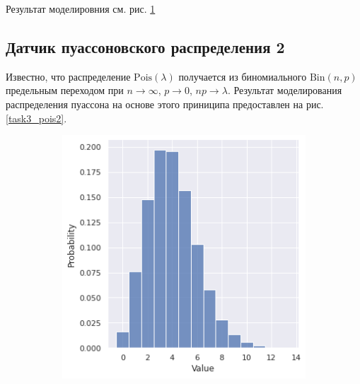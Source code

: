     Результат моделировния см. рис. \ref{task3_pois1}

\subsection{Датчик пуассоновского распределения 2}
    Известно, что распределение $\mathrm{Pois}(\lambda)$ получается из 
    биномиального $\mathrm{Bin}(n,p)$ предельным переходом при $n\rightarrow 
    \infty$, $p \rightarrow 0$, $np \rightarrow \lambda$. Результат моделирования 
    распределения пуассона на основе этого приниципа предоставлен на рис. \ref{task3_pois2}.

    \begin{figure}[tbp]
        \centering
        \begin{subfigure}[b]{0.48\textwidth}
            \centering
            \includegraphics[width=\textwidth]{resources/task3_pois1.png}
            \caption{}
            \label{task3_pois1}
        \end{subfigure}
        \hfill
        \begin{subfigure}[b]{0.48\textwidth}
            \centering

\end{subfigure}
\end{figure}
